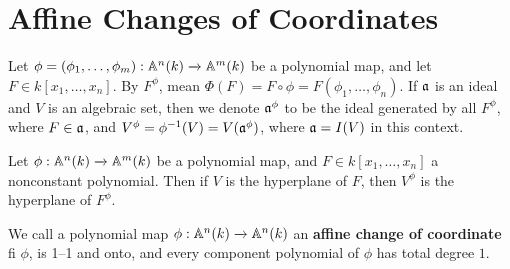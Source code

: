 \section{Affine Changes of Coordinates}

Let $\phi=(\phi_1, \dots, \phi_m):\mathbb{A}^n(k) \xrightarrow{} \mathbb{A}^m(k)$ be a
polynomial map, and let $F \in k[x_1, \dots, x_n]$. By $F^\phi$, mean $\Phi(F)=F
\circ \phi=F(\phi_1, \dots, \phi_n)$. If $\mathfrak{a}$ is an ideal and $V$ is an
algebraic set, then we denote $\mathfrak{a}^\phi$ to be the ideal generated by all
$F^\phi$, where $F \in \mathfrak{a}$, and $V^\phi=\phi^{-1}(V)=V(\mathfrak{a}^\phi)$, where
$\mathfrak{a}=I(V)$ in this context.

\begin{example}\label{example_2.3}
  Let $\phi:\mathbb{A}^n(k) \xrightarrow{} \mathbb{A}^m(k)$ be a polynomial map, and $F \in
  k[x_1, \dots, x_n]$ a nonconstant polynomial. Then if $V$ is the hyperplane
  of $F$, then $V^\phi$ is the hyperplane of  $F^\phi$.
\end{example}

\begin{definition}
  We call a polynomial map $\phi:\mathbb{A}^n(k) \xrightarrow{} \mathbb{A}^n(k)$ an
  \textbf{affine change of coordinate} fi $\phi$, is 1--1 and onto, and every
  component polynomial of $\phi$ has total degree $1$.
\end{definition}

